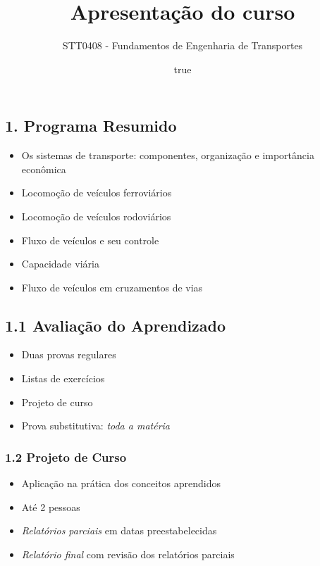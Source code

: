 \documentclass[
]{article}
\title{Apresentação do curso}
\subtitle{STT0408 - Fundamentos de Engenharia de Transportes}
\author{true}
\date{}
\providecommand{\tightlist}{%
  \setlength{\itemsep}{0pt}\setlength{\parskip}{0pt}}
\begin{document}
\maketitle

\hypertarget{programa-resumido}{%
\subsection{1. Programa Resumido}\label{programa-resumido}}

\begin{itemize}
\tightlist
\item
  Os sistemas de transporte: componentes, organização e importância
  econômica
\item
  Locomoção de veículos ferroviários
\item
  Locomoção de veículos rodoviários
\item
  Fluxo de veículos e seu controle
\item
  Capacidade viária
\item
  Fluxo de veículos em cruzamentos de vias
\end{itemize}

\hypertarget{avaliauxe7uxe3o-do-aprendizado}{%
\subsection{1.1 Avaliação do
Aprendizado}\label{avaliauxe7uxe3o-do-aprendizado}}

\begin{itemize}
\tightlist
\item
  Duas provas regulares
\item
  Listas de exercícios
\item
  Projeto de curso
\item
  Prova substitutiva: \emph{toda a matéria}
\end{itemize}

\hypertarget{projeto-de-curso}{%
\subsubsection{1.2 Projeto de Curso}\label{projeto-de-curso}}

\begin{itemize}
\tightlist
\item
  Aplicação na prática dos conceitos aprendidos
\item
  Até 2 pessoas
\item
  \emph{Relatórios parciais} em datas preestabelecidas
\item
  \emph{Relatório final} com revisão dos relatórios parciais
\end{itemize}
\end{document}
